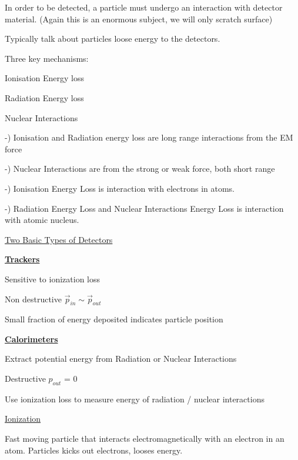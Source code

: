 {In order to be detected, a particle must undergo an interaction with detector material.
(Again this is an enormous subject, we will only scratch surface)


Typically talk about particles loose energy to the detectors. 

Three key mechanisms:

{\Large
\bi
\item[-] Ionisation Energy loss 
\item[-] Radiation Energy loss 
\item[-] Nuclear Interactions
\ei
}

-) Ionisation and Radiation energy loss are long range interactions from the EM force

-) Nuclear Interactions are from the strong or weak force, both short range

-) Ionisation Energy Loss is interaction with electrons in atoms.

-) Radiation Energy Loss and Nuclear Interactions Energy Loss is interaction with atomic nucleus.


\underline{Two Basic Types of Detectors}

\textbf{\underline{Trackers} }
\bi
\item[-] Sensitive to ionization loss
\item[-] Non destructive $\vec{p}_{in} \sim \vec{p}_{out}$
\item[-] Small fraction of energy deposited indicates particle position
\ei


\textbf{\underline{Calorimeters} }
\bi
\item[-] Extract potential energy from Radiation or Nuclear Interactions 
\item[-] Destructive $p_{out}$ = 0
\item[-] Use ionization loss to measure energy of radiation / nuclear interactions 
\ei


\lineacross

\underline{Ionization}

Fast moving particle that interacts electromagnetically with  an electron in an atom.
Particles kicks out electrons, looses energy.

}
